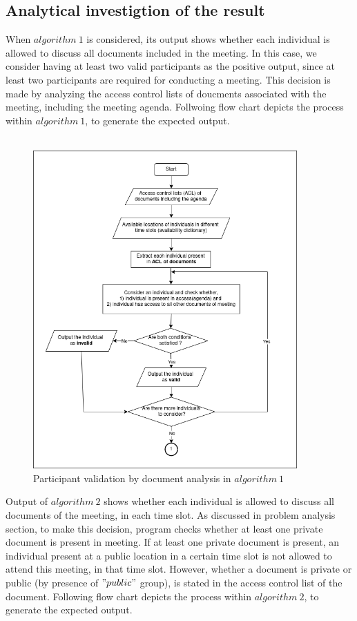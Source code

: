 \subsection{Analytical investigtion of the result}
When $algorithm\ 1$ is considered, its output shows whether each individual is allowed to discuss all documents included in the meeting. In this case, we consider having at least two valid participants as the positive output, since at least two participants are required for conducting a meeting. This decision is made by analyzing the access control lists of doucments associated with the meeting, including the meeting agenda. Follwoing flow chart depicts the process within $algorithm\ 1$, to generate the expected output.\\ \\
\begin{figure}[H]
    \centering
    \includegraphics[width=0.9\textwidth]{./image/algo01_result_analysis.png}
    \caption{Participant validation by document analysis in $algorithm\ 1$}
    \label{fig:Participant validation by document analysis in algorithm 1}
\end{figure}
Output of $algorithm\ 2$ shows whether each individual is allowed to discuss all documents of the meeting, in each time slot. As discussed in problem analysis section, to make this decision, program checks whether at least one private document is present in meeting. If at least one private document is present, an individual present at a public location in a certain time slot is not allowed to attend this meeting, in that time slot. However, whether a document is private or public (by presence of $"public"$ group), is stated in the access control list of the document. Following flow chart depicts the process within $algorithm\ 2$, to generate the expected output.\\ \\
